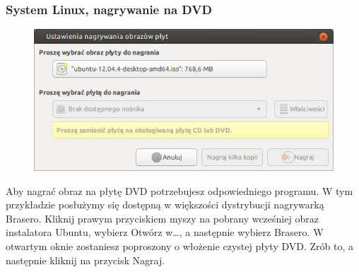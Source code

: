 \subsubsection{System Linux, nagrywanie na DVD}
\begin{figure}
                \includegraphics[width=\linewidth]{images/instalacja_nagrywanie_obrazu_linux_DVD.png}
\end{figure}

Aby nagrać obraz na płytę DVD potrzebujesz odpowiedniego programu. W tym przykładzie posłużymy się dostępną w większości dystrybucji nagrywarką Brasero. Kliknij prawym przyciskiem myszy na pobrany wcześniej obraz instalatora Ubuntu, wybierz \textcolor{ubuntu_orange}{Otwórz w\ldots}, a następnie wybierz \textcolor{ubuntu_orange}{Brasero}. W otwartym oknie zostaniesz poproszony o włożenie czystej płyty DVD. Zrób to, a następnie kliknij na przycisk \textcolor{ubuntu_orange}{Nagraj}.
\clearpage
